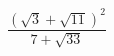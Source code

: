 \begin{ex}[type=calculate]
	\begin{condition}
		\( \dfrac{(\sqrt{3}+\sqrt{11})^2}{7+\sqrt{33}} \)
	\end{condition}
\end{ex}